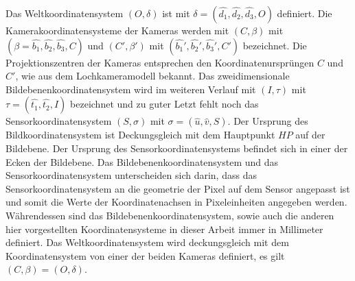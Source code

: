%
Das Weltkoordinatensystem $(O,\delta)$ ist mit $\delta = (\hat{d_1},\hat{d_2},\hat{d_3},O)$ definiert.
Die Kamerakoordinatensysteme der Kameras werden mit $(C,\beta)$ mit $(\beta = \hat{b_1},\hat{b_2},\hat{b_3},C)$ und $(C',\beta')$ mit $(\hat{b_1}',\hat{b_2}',\hat{b_3}',C')$ bezeichnet. Die Projektionszentren der Kameras entsprechen den Koordinatenursprüngen $C$ und $C'$, wie aus dem Lochkameramodell bekannt. Das zweidimensionale Bildebenenkoordinatensystem wird im weiteren Verlauf mit $(I,\tau)$ mit $\tau = (\hat{t_1},\hat{t_2},I)$ bezeichnet und zu guter Letzt fehlt noch das Sensorkoordinatensystem $(S,\sigma)$ mit $\sigma = (\hat{u},\hat{v},S)$.  Der Ursprung des Bildkoordinatensystem ist Deckungsgleich mit dem Hauptpunkt $HP$ auf der Bildebene. Der Ursprung des Sensorkoordinatensystems befindet sich in einer der Ecken der Bildebene. Das Bildebenenkoordinatensystem und das Sensorkoordinatensystem unterscheiden sich darin, dass das Sensorkoordinatensystem an die geometrie der Pixel auf dem Sensor angepasst ist und somit die Werte der Koordinatenachsen in Pixeleinheiten angegeben werden. Währendessen sind das Bildebenenkoordinatensystem, sowie auch die anderen hier vorgestellten Koordinatensysteme in dieser Arbeit immer in Millimeter definiert. Das Weltkoordinatensystem wird deckungsgleich mit dem Koordinatensystem von einer der beiden Kameras definiert, es gilt $(C,\beta)=(O,\delta)$.
 


